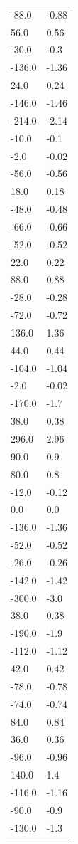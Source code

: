\begin{longtable}{ll}
-88.0 & -0.88 \\
56.0 & 0.56 \\
-30.0 & -0.3 \\
-136.0 & -1.36 \\
24.0 & 0.24 \\
-146.0 & -1.46 \\
-214.0 & -2.14 \\
-10.0 & -0.1 \\
-2.0 & -0.02 \\
-56.0 & -0.56 \\
18.0 & 0.18 \\
-48.0 & -0.48 \\
-66.0 & -0.66 \\
-52.0 & -0.52 \\
22.0 & 0.22 \\
88.0 & 0.88 \\
-28.0 & -0.28 \\
-72.0 & -0.72 \\
136.0 & 1.36 \\
44.0 & 0.44 \\
-104.0 & -1.04 \\
-2.0 & -0.02 \\
-170.0 & -1.7 \\
38.0 & 0.38 \\
296.0 & 2.96 \\
90.0 & 0.9 \\
80.0 & 0.8 \\
-12.0 & -0.12 \\
0.0 & 0.0 \\
-136.0 & -1.36 \\
-52.0 & -0.52 \\
-26.0 & -0.26 \\
-142.0 & -1.42 \\
-300.0 & -3.0 \\
38.0 & 0.38 \\
-190.0 & -1.9 \\
-112.0 & -1.12 \\
42.0 & 0.42 \\
-78.0 & -0.78 \\
-74.0 & -0.74 \\
84.0 & 0.84 \\
36.0 & 0.36 \\
-96.0 & -0.96 \\
140.0 & 1.4 \\
-116.0 & -1.16 \\
-90.0 & -0.9 \\
-130.0 & -1.3 \\

\end{longtable}
